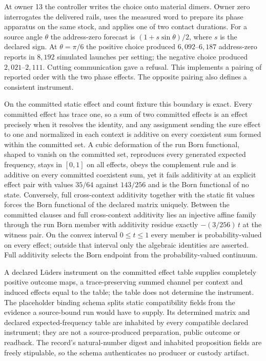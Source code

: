 \documentclass[11pt]{article}
\begin{document}
At owner 13 the controller writes the choice onto material dimers.
Owner zero interrogates the delivered rails, uses the measured word to
prepare its phase apparatus on the same stock, and applies one of two
contact durations. For a source angle $\theta$ the address-zero forecast
is $(1+s\sin\theta)/2$, where $s$ is the declared sign. At
$\theta=\pi/6$ the positive choice produced $6{,}092$--$6{,}187$
address-zero reports in $8{,}192$ simulated launches per setting; the
negative choice produced $2{,}021$--$2{,}111$. Cutting communication
gave a refusal. This implements a pairing of reported order with the
two phase effects. The opposite pairing also defines a consistent
instrument.

On the committed static effect and count fixture this boundary is exact.
Every committed effect has trace one, so a sum of two committed effects is an
effect precisely when it resolves the identity, and any assignment sending
the sure effect to one and normalized in each context is additive on every
coexistent sum formed within the committed set. A cubic deformation of the run
Born functional, shaped to vanish on the committed set, reproduces every
generated expected frequency, stays in \([0,1]\) on all effects, obeys the
complement rule and is additive on every committed coexistent sum, yet it
fails additivity at an explicit effect pair with values \(35/64\) against
\(143/256\) and is the Born functional of no state. Conversely, full
cross-context additivity together with the static fit values forces the Born
functional of the declared matrix uniquely. Between the committed clauses and
full cross-context additivity lies an injective affine family through the run
Born member with additivity residue exactly \(-(3/256)\,t\) at the witness
pair. On the convex interval \(0\leq t\leq1\) every member is
probability-valued on every effect; outside that interval only the algebraic
identities are asserted. Full additivity selects the Born endpoint from the
probability-valued continuum.

A declared L\"uders instrument on the committed effect table supplies
completely positive outcome maps, a trace-preserving summed channel per
context and induced effects equal to the table; the table does not determine
the instrument. The placeholder binding schema splits static compatibility
fields from the evidence a source-bound run would have to supply. Its
determined matrix and declared expected-frequency table are inhabited by
every compatible declared instrument; they are not a source-produced
preparation, public outcome or readback. The record's natural-number digest
and inhabited proposition fields are freely stipulable, so the schema
authenticates no producer or custody artifact.
\end{document}
